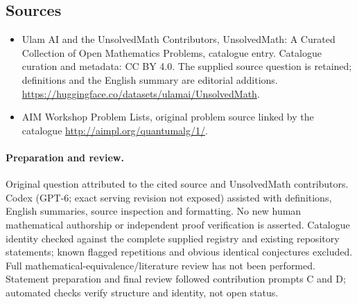 \documentclass[11pt]{article}
\begin{document}
\subsection{Sources}
\begin{itemize}
\item[\hypertarget{source:statement:1}{S1}] Ulam AI and the UnsolvedMath Contributors, UnsolvedMath: A Curated Collection of Open Mathematics Problems, catalogue entry. Catalogue curation and metadata: CC BY 4.0. The supplied source question is retained; definitions and the English summary are editorial additions.
\url{https://huggingface.co/datasets/ulamai/UnsolvedMath}.
\item[\hypertarget{source:statement:2}{S2}] AIM Workshop Problem Lists, original problem source linked by the catalogue
\url{http://aimpl.org/quantumalg/1/}.
\end{itemize}
\paragraph{Preparation and review.}
Original question attributed to the cited source and UnsolvedMath contributors. Codex (GPT-6; exact serving revision not exposed) assisted with definitions, English summaries, source inspection and formatting. No new human mathematical authorship or independent proof verification is asserted. Catalogue identity checked against the complete supplied registry and existing repository statements; known flagged repetitions and obvious identical conjectures excluded. Full mathematical-equivalence/literature review has not been performed. Statement preparation and final review followed contribution prompts C and D; automated checks verify structure and identity, not open status.
\label{end:statement}
\end{document}
